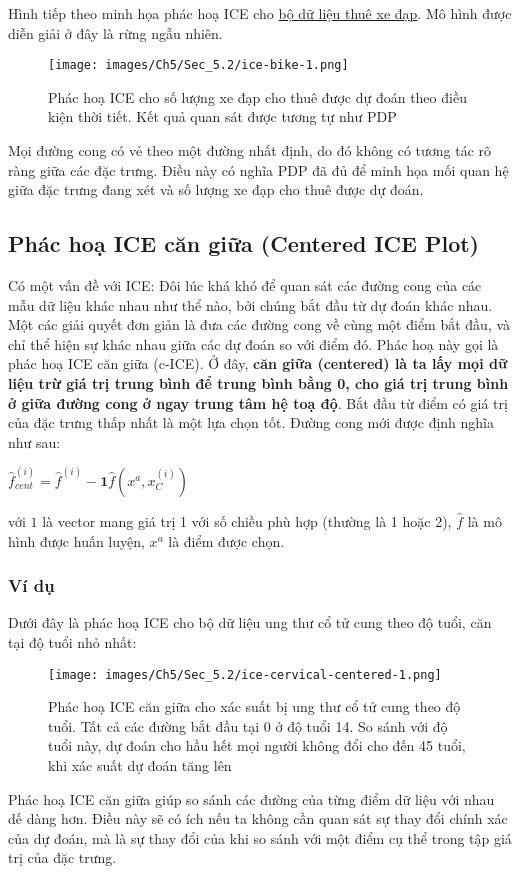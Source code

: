 Hình tiếp theo minh họa phác hoạ ICE cho \href{chap_3.1}{bộ dữ liệu thuê xe đạp}. Mô hình được diễn giải ở đây là rừng ngẫu nhiên.
\begin{figure*}[h!]
	\centering
	\texttt{[image: images/Ch5/Sec\_5.2/ice-bike-1.png]}
	\label{fig:5_7}
	\caption{Phác hoạ ICE cho số lượng xe đạp cho thuê được dự đoán theo điều kiện thời tiết. Kết quả quan sát được tương tự như PDP}
\end{figure*}
Mọi đường cong có vẻ theo một đường nhất định, do đó không có tương tác rõ ràng giữa các đặc trưng. Điều này có nghĩa PDP đã đủ để minh họa mối quan hệ giữa đặc trưng đang xét và số lượng xe đạp cho thuê được dự đoán.
\subsection{Phác hoạ ICE căn giữa (Centered ICE Plot)}
Có một vấn đề với ICE: Đôi lúc khá khó để quan sát các đường cong của các mẫu dữ liệu khác nhau như thể nào, bởi chúng bắt đầu từ dự đoán khác nhau. Một các giải quyết đơn giản là đưa các đường cong về cùng một điểm bắt đầu, và chỉ thể hiện sự khác nhau giữa các dự đoán so với điểm đó. Phác hoạ này gọi là phác hoạ ICE căn giữa (c-ICE). Ở đây, \textbf{căn giữa (centered) là ta lấy mọi dữ liệu trừ giá trị trung bình để trung bình bằng 0, cho giá trị trung bình ở giữa đường cong ở ngay trung tâm hệ toạ độ}. Bắt đầu từ điểm có giá trị của đặc trưng thấp nhất là một lựa chọn tốt. Đường cong mới được định nghĩa như sau:
\begin{center}
    $\hat{f}_{cent}^{(i)}=\hat{f}^{(i)}-\mathbf{1}\hat{f}(x^{a},x^{(i)}_{C})$
\end{center}
với $1$ là vector mang giá trị 1 với số chiều phù hợp (thường là 1 hoặc 2), $\hat{f}$ là mô hình được huấn luyện, $x^a$ là điểm được chọn.
\subsubsection{Ví dụ}
Dưới đây là phác hoạ ICE cho bộ dữ liệu ung thư cổ tử cung theo độ tuổi, căn tại độ tuổi nhỏ nhất:
\begin{figure*}[h!]
	\centering
	\texttt{[image: images/Ch5/Sec\_5.2/ice-cervical-centered-1.png]}
	\label{fig:5_8}
	\caption{Phác hoạ ICE căn giữa cho xác suất bị ung thư cổ tử cung theo độ tuổi. Tất cả các đường bắt đầu tại 0 ở độ tuổi 14. So sánh với độ tuổi này, dự đoán cho hầu hết mọi người không đổi cho đến 45 tuổi, khi xác suất dự đoán tăng lên}
\end{figure*}
Phác hoạ ICE căn giữa giúp so sánh các đường của từng điểm dữ liệu với nhau dế dàng hơn. Điều này sẽ có ích nếu ta không cần quan sát sự thay đổi chính xác của dự đoán, mà là sự thay đổi của khi so sánh với một điểm cụ thể trong tập giá trị của đặc trưng.

